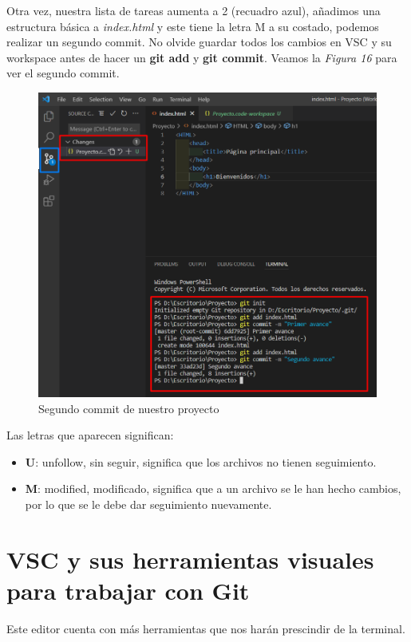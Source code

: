 Otra vez, nuestra lista de tareas aumenta a 2 (recuadro azul), añadimos una estructura básica a \textit{index.html} y este tiene la letra M a su costado, podemos realizar un segundo commit. No olvide guardar todos los cambios en VSC y su workspace antes de hacer un \textbf{git add} y \textbf{git commit}. Veamos la \textit{Figura 16} para ver el segundo commit.
\begin{figure}[H]
    \begin{center}
        \caption{Segundo commit de nuestro proyecto}
        \label{fig: 16}
        \includegraphics[width=12cm]{capturas/segundo commit.png}
    \end{center}
\end{figure}

Las letras que aparecen significan:
\begin{itemize}
    \item \textbf{U}: unfollow, sin seguir, significa que los archivos no tienen seguimiento.
    \item \textbf{M}: modified, modificado, significa que a un archivo se le han hecho cambios, por lo que se le debe dar seguimiento nuevamente.
\end{itemize}





\section{VSC y sus herramientas visuales para trabajar con Git}
\hspace{0.55cm}Este editor cuenta con más herramientas que nos harán prescindir de la terminal.




